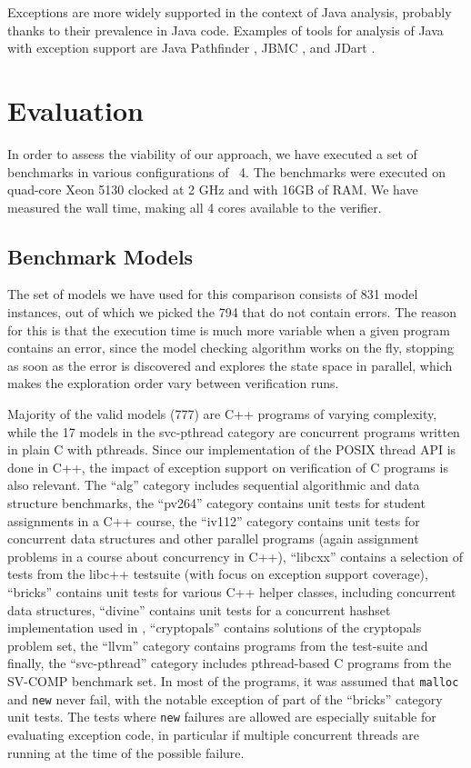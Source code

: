 Exceptions are more widely supported in the context of Java analysis, probably thanks to their prevalence in Java code.
Examples of tools for analysis of Java with exception support are Java Pathfinder , JBMC , and JDart .

\section{Evaluation}\label{sec:lang:evaluation}

In order to assess the viability of our approach, we have executed a set
of benchmarks in various configurations of \divine{}~4. The benchmarks were
executed on quad-core Xeon 5130 clocked at 2 GHz and with 16GB of RAM.
We have measured the wall time, making all 4 cores available to the
verifier.

\subsection{Benchmark Models}\label{benchmark-models}

The set of models we have used for this comparison consists of 831 model
instances, out of which we picked the 794 that do not contain errors.
The reason for this is that the execution time is much more variable
when a given program contains an error, since the model checking
algorithm works on the fly, stopping as soon as the error is discovered and
explores the state space in parallel, which makes the exploration order vary
between verification runs.

Majority of the valid models (777) are C++ programs of varying
complexity, while the 17 models in the svc-pthread category are
concurrent programs written in plain C with pthreads. Since our
implementation of the POSIX thread API is done in C++, the impact of
exception support on verification of C programs is also relevant. The
``alg'' category includes sequential algorithmic and data structure
benchmarks, the ``pv264'' category contains unit tests for student
assignments in a C++ course, the ``iv112'' category contains unit tests
for concurrent data structures and other parallel programs (again assignment
problems in a course about concurrency in C++), ``libcxx'' contains a selection
of tests from
the libc++ testsuite (with focus on exception support
coverage), ``bricks'' contains unit tests for various C++ helper
classes, including concurrent data structures, ``divine'' contains unit
tests for a concurrent hashset implementation used in \divine{},
``cryptopals'' contains solutions of the cryptopals problem
set, the ``llvm'' category
contains programs from the \llvm{} test-suite
and finally, the ``svc-pthread'' category includes pthread-based C
programs from the SV-COMP benchmark set. In most of the programs, it was
assumed that \texttt{malloc} and \texttt{new} never fail, with the
notable exception of part of the ``bricks'' category unit tests. The
tests where \texttt{new} failures are allowed are especially suitable
for evaluating exception code, in particular if multiple concurrent
threads are running at the time of the possible failure.

